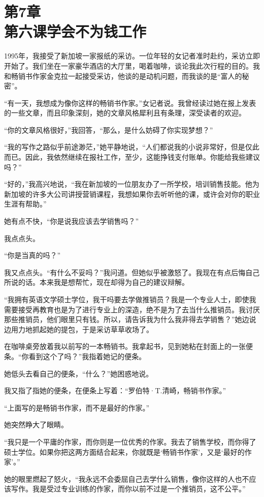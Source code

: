 \section[第7章\q 第六课\q 学会不为钱工作]{第7章\\第六课\q 学会不为钱工作}

1995年，我接受了新加坡一家报纸的采访。一位年轻的女记者准时赴约，采访立即开始了。我们坐在一家豪华酒店的大厅里，喝着咖啡，谈论我此次行程的目的。我和畅销书作家金克拉一起接受采访，他谈的是动机问题，而我谈的是“富人的秘密”。

“有一天，我想成为像你这样的畅销书作家。”女记者说。我曾经读过她在报上发表的一些文章，而且印象深刻，她的文章风格犀利且有条理，深受读者的欢迎。

“你的文章风格很好，”我回答，“那么，是什么妨碍了你实现梦想？”

“我的写作之路似乎前途渺茫，”她平静地说，“人们都说我的小说非常好，但是仅此而已。因此，我依然继续在报社工作，至少，这能挣钱支付账单。你能给我些建议吗？”

“好的，”我高兴地说，“我在新加坡的一位朋友办了一所学校，培训销售技能。他为新加坡的许多大公司讲授营销课程，我想如果你去听听他的课，或许会对你的职业生涯有帮助。”

她有点不快，“你是说我应该去学销售吗？”

我点点头。

“你是当真的吗？”

我又点点头。“有什么不妥吗？”我问道。但她似乎被激怒了。我现在有点后悔自己所说的话。本来我是想帮忙，现在却得为自己的建议辩解。

“我拥有英语文学硕士学位，我干吗要去学做推销员？我是一个专业人士，即使我需要接受再教育也是为了进行专业上的深造，绝不是为了去当什么推销员。我讨厌那些推销员，他们眼里只有钱。所以，请告诉我为什么我非得去学销售？”她边说边用力地抓起她的提包，于是采访草草收场了。

在咖啡桌旁放着我以前写的一本畅销书。我拿起书，见到她粘在封面上的一张便条。“你看到这个了吗？”我指着她记的便条。

她低头去看自己的便条，“什么？”她困惑地说。

我又指了指她的便条，在便条上写着：“罗伯特·T.清崎，畅销书作家。”

“上面写的是畅销书作家，而不是最好的作家。”

她突然睁大了眼睛。

“我只是一个平庸的作家，而你则是一位优秀的作家。我去了销售学校，而你得了硕士学位。如果你把这两方面结合起来，你就既是‘畅销书作家’，又是‘最好的作家’。”

她的眼里燃起了怒火，“我永远不会委屈自己去学什么销售，像你这样的人也不应该写作。我是受过专业训练的作家，而你以前不过是一个推销员，这不公平。”

